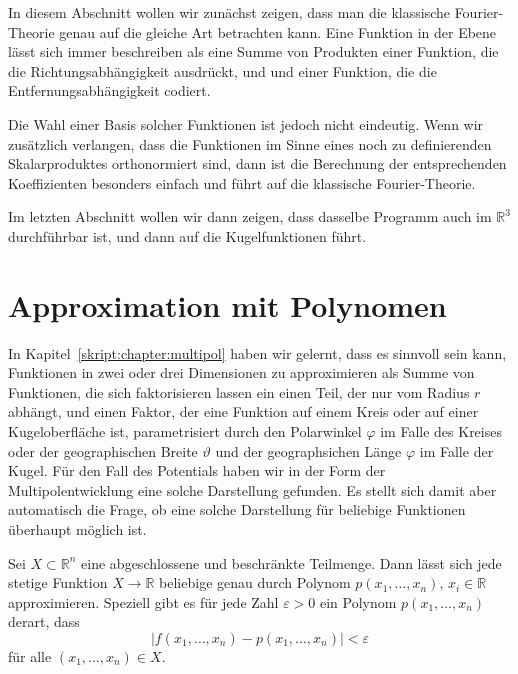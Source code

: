 In diesem Abschnitt wollen wir zunächst zeigen, dass man die klassische
Fourier-Theorie genau auf die gleiche Art betrachten kann.
Eine Funktion in der Ebene lässt sich immer beschreiben als eine Summe
von Produkten einer Funktion, die die Richtungsabhängigkeit ausdrückt, und
und einer Funktion, die die Entfernungsabhängigkeit codiert.

Die Wahl einer Basis solcher Funktionen ist jedoch nicht eindeutig.
Wenn wir zusätzlich verlangen, dass die Funktionen im Sinne eines noch
zu definierenden Skalarproduktes orthonormiert sind, dann ist die
Berechnung der entsprechenden Koeffizienten besonders einfach und
führt auf die klassische Fourier-Theorie.

Im letzten Abschnitt wollen wir dann zeigen, dass dasselbe Programm
auch im $\mathbb R^3$ durchführbar ist, und dann auf die Kugelfunktionen
führt.

\section{Approximation mit Polynomen
\label{skript:section:approximation}}
In Kapitel~\ref{skript:chapter:multipol} haben wir gelernt, dass es
sinnvoll sein kann, Funktionen in zwei oder drei Dimensionen zu 
approximieren als Summe von Funktionen, die sich faktorisieren lassen
ein einen Teil, der nur vom Radius $r$ abhängt, und einen Faktor,
der eine Funktion auf einem Kreis oder auf einer Kugeloberfläche
ist, parametrisiert durch den Polarwinkel $\varphi$ im Falle des
Kreises oder der geographischen Breite $\vartheta$ und der geographsichen
Länge $\varphi$ im Falle der Kugel.
Für den Fall des Potentials haben wir in der Form der Multipolentwicklung
eine solche Darstellung gefunden.
Es stellt sich damit aber automatisch die Frage, ob eine solche
Darstellung für beliebige Funktionen überhaupt möglich ist.

\begin{satz}[Weierstrass]
\label{skript:satz:weierstrass}
Sei $X\subset\mathbb R^n$ eine abgeschlossene und beschränkte Teilmenge.
Dann lässt sich jede stetige Funktion $X\to\mathbb R$ beliebige genau durch
Polynom $p(x_1,\dots,x_n)$, $x_i\in\mathbb R$
approximieren.
Speziell gibt es für jede Zahl $\varepsilon>0$ ein Polynom $p(x_1,\dots,x_n)$
derart, dass
\[
|f(x_1,\dots,x_n)- p(x_1,\dots,x_n)|<\varepsilon
\]
für alle $(x_1,\dots,x_n)\in X$.
\end{satz}

